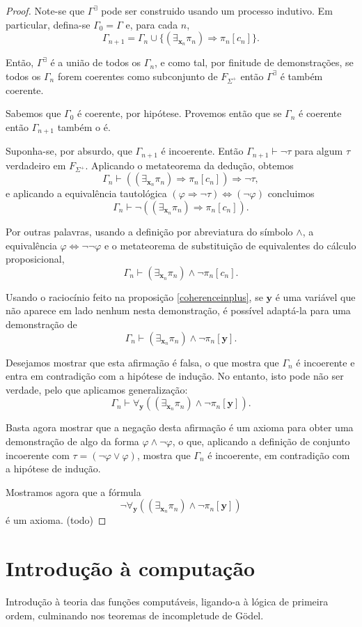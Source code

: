 \documentclass{report}
\theoremstyle{definition}
\theoremstyle{remark}
\renewcommand{\bf}[1]{\mathbf{#1}}
\newcommand{\imply}{\mathbin{\Rightarrow}}
\newcommand{\eqv}{\mathbin{\Leftrightarrow}}
\begin{document}
	\begin{proof}
	Note-se que $\Gamma^\exists$ pode ser construido usando um processo indutivo. Em particular, defina-se $\Gamma_0 = \Gamma$ e, para cada $n$,
	\[\Gamma_{n+1} = \Gamma_n \cup \{(\exists_{\bf x_n} \pi_n) \imply \pi_n[c_n]\}.\]
	
	Então, $\Gamma^\exists$ é a união de todos os $\Gamma_n$, e como tal, por finitude de demonstrações, se todos os $\Gamma_n$ forem coerentes como subconjunto de $F_{\Sigma^+}$ então $\Gamma^\exists$ é também coerente.
	
	Sabemos que $\Gamma_0$ é coerente, por hipótese. Provemos então que se $\Gamma_n$ é coerente então $\Gamma_{n+1}$ também o é.
	
	Suponha-se, por absurdo, que $\Gamma_{n+1}$ é incoerente. Então $\Gamma_{n+1} \vdash \neg \tau$ para algum $\tau$ verdadeiro em $F_{\Sigma^+}$. Aplicando o metateorema da dedução, obtemos
	\[\Gamma_n \vdash ((\exists_{\bf x_n} \pi_n) \imply \pi_n[c_n]) \imply \neg \tau,\]
	e aplicando a equivalência tautológica $(\varphi \imply \neg \tau) \eqv (\neg \varphi)$ concluimos
	\[\Gamma_n \vdash \neg ((\exists_{\bf x_n} \pi_n) \imply \pi_n[c_n]).\]
	
	Por outras palavras, usando a definição por abreviatura do símbolo $\land$, a equivalência $\varphi \eqv \neg \neg \varphi$ e o metateorema de substituição de equivalentes do cálculo proposicional,
	\[\Gamma_n \vdash (\exists_{\bf x_n} \pi_n) \land \neg \pi_n[c_n].\]
	
	Usando o raciocínio feito na proposição \ref{coherenceinplus}, se $\bf y$ é uma variável que não aparece em lado nenhum nesta demonstração, é possível adaptá-la para uma demonstração de
	\[\Gamma_n \vdash (\exists_{\bf x_n} \pi_n) \land \neg \pi_n[\bf y].\]
	
	Desejamos mostrar que esta afirmação é falsa, o que mostra que $\Gamma_n$ é incoerente e entra em contradição com a hipótese de indução. No entanto, isto pode não ser verdade, pelo que aplicamos generalização:
	\[\Gamma_n \vdash \forall_{\bf y}((\exists_{\bf x_n} \pi_n) \land \neg \pi_n[\bf y]).\]
	
	Basta agora mostrar que a negação desta afirmação é um axioma para obter uma demonstração de algo da forma $\varphi \land \neg \varphi$, o que, aplicando a definição de conjunto incoerente com $\tau = (\neg \varphi \lor \varphi)$, mostra que $\Gamma_n$ é incoerente, em contradição com a hipótese de indução.
	
	Mostramos agora que a fórmula
	\[\neg \forall_{\bf y}((\exists_{\bf x_n} \pi_n) \land \neg \pi_n[\bf y])\]
	é um axioma. (todo)
	
	\end{proof}
	
	
	\chapter{Introdução à computação}
	
	Introdução à teoria das funções computáveis, ligando-a à lógica de primeira ordem, culminando nos teoremas de incompletude de Gödel.
	
	
	\nocite{fltc}
	\nocite{shoenfield}
	
	
	
\end{document}
